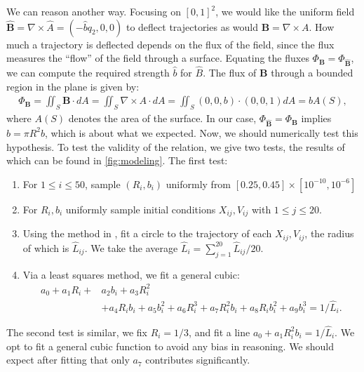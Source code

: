 We can reason another way. Focusing on $[0,1]^2$, we would like the uniform field $\mathbf{\hat B}=\nabla\times \hat A=(-\hat bq_2,0,0)$ to deflect trajectories as would $\mathbf B =\nabla\times A$. How much a trajectory is deflected depends on the flux of the field, since the flux measures the ``flow'' of the field through a surface. Equating the fluxes $\Phi_{\mathbf B}=\Phi_{\mathbf{\hat B}}$, we can compute the required strength $\hat b$ for $\hat B$. The flux of $\mathbf B$ through a bounded region in the plane is given by:
\begin{align*}
\Phi_{\mathbf B} 
  = \iint_{S}\mathbf B\cdot dA
  = \iint_{S}\nabla\times A\cdot dA
  = \iint_{S}(0,0,b)\cdot (0,0,1) dA = b A(S), 
\end{align*}
where $A(S)$ denotes the area of the surface. In our case, $\Phi_{\mathbf{\hat B}}=\Phi_{\mathbf B}$ implies $\hat b = \pi R^2 b$, which is about what we expected. Now, we should numerically test this hypothesis. To test the validity of the relation, we give two tests, the results of which can be found in \cref{fig:modeling}. The first test:
\begin{enumerate}
\item For $1\le i\le 50$, sample $(R_i, b_i)$ uniformly from $[0.25,0.45]\times[10^{-10},10^{-6}]$ 
\item For $R_i, b_i$ uniformly sample initial conditions $X_{ij},V_{ij}$ with $1\le j\le 20$.
\item Using the method in \cite{Coope93}, fit a circle to the trajectory of each $X_{ij}, V_{ij}$, the radius of which is $\hat L_{ij}$. We take the average $\hat L_i=\sum_{j=1}^{20}\hat L_{ij}/20$. 
\item Via a least squares method, we fit a general cubic:
\begin{align*}
a_0 + a_1R_i + &a_2b_i + a_3R_i^2 \\
  &+ a_4R_ib_i + a_5b_i^2 + a_6R_i^3 +a_7R_i^2b_i+a_8R_ib_i^2+a_9b_i^3=1/\hat L_i.
\end{align*}
\end{enumerate}
The second test is similar, we fix $R_i=1/3$, and fit a line $a_0+a_1R_i^2b_i=1/\hat L_i$. We opt to fit a general cubic function to avoid any bias in reasoning. We should expect after fitting that only $a_7$ contributes significantly.

 


